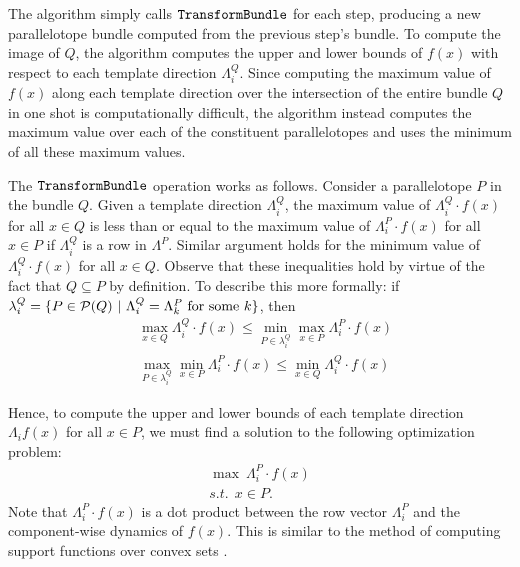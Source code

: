 





The algorithm simply calls $\texttt{TransformBundle}$ for each step, producing a new parallelotope bundle computed from the previous step's bundle.
%
To compute the image of $Q$, the algorithm computes the upper and lower bounds of $f(x)$ with respect to each template direction $\Lambda_i^Q$.
%
Since computing the maximum value of $f(x)$ along each template direction over the intersection of the entire bundle $Q$ in one shot is computationally difficult, the algorithm instead computes the maximum value over each of the constituent parallelotopes and uses the minimum of all these maximum values.

The $\texttt{TransformBundle}$  operation works as follows.
%
Consider a parallelotope $P$ in the bundle $Q$.
%
Given a template direction $\Lambda_i^Q$, the maximum value of $\Lambda_{i}^Q \cdot f(x)$ for all $x \in Q$ is less than or equal to the maximum value of $\Lambda_{i}^P \cdot f(x)$ for all $x \in P$ if $\Lambda_i^Q$ is a row in $\Lambda^P$.
%
Similar argument holds for the minimum value of $\Lambda_{i}^Q \cdot f(x)$ for all $x \in Q$.
%
Observe that these inequalities hold by virtue of the fact that $Q \subseteq P$ by definition.
%
To describe this more formally: if $\lambda^Q_i = \{ P \in \mathcal{P}(Q) ~|~ \Lambda_i^Q = \Lambda_k^P \text{ for some } k \}$, then
%
\begin{align}
    & \max_{x \in Q}{\Lambda_{i}^Q \cdot f(x)} \leq \min_{P \in \lambda^Q_i} {\max_{x \in P}{\Lambda_{i}^P \cdot f(x)}}  \label{eq:max_over_ptopes}
 \\
    & \max_{P \in \lambda^Q_i} {\min_{x \in P}{\Lambda_{i}^P \cdot f(x)}} \leq \min_{x \in Q}{\Lambda_{i}^Q \cdot f(x)} \label{eq:min_over_ptopes}
\end{align}

%
%
%
%
\noindent Hence, to compute the upper and lower bounds of each template direction $\Lambda_{i} f(x)$ for all $x \in P$, we must find a solution to the following optimization problem:
%
\begin{eqnarray}
  \max ~ \Lambda_i^{P} \cdot f(x) \label{eq:maxf}\\
  s.t. ~~ x \in P.\nonumber
\end{eqnarray}
%
\noindent Note that $\Lambda_i^{P} \cdot f(x)$ is a dot product between the row vector $\Lambda_i^{P}$ and the component-wise dynamics of $f(x)$. This is similar to the method of computing support functions over convex sets \cite{boyd2004convex}.


